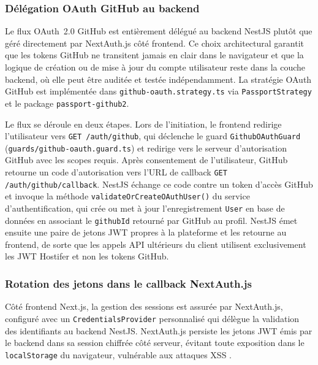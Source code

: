 \subsubsection*{Délégation OAuth GitHub au backend}

Le flux OAuth~2.0 GitHub est entièrement délégué au backend NestJS plutôt que géré directement par NextAuth.js côté frontend. Ce choix architectural garantit que les tokens GitHub ne transitent jamais en clair dans le navigateur et que la logique de création ou de mise à jour du compte utilisateur reste dans la couche backend, où elle peut être auditée et testée indépendamment. La stratégie OAuth GitHub est implémentée dans \texttt{github-oauth.strategy.ts} via \texttt{PassportStrategy} et le package \texttt{passport-github2}.

Le flux se déroule en deux étapes. Lors de l'initiation, le frontend redirige l'utilisateur vers \texttt{GET /auth/github}, qui déclenche le guard \texttt{GithubOAuthGuard} (\texttt{guards/github-oauth.guard.ts}) et redirige vers le serveur d'autorisation GitHub avec les scopes requis. Après consentement de l'utilisateur, GitHub retourne un code d'autorisation vers l'URL de callback \texttt{GET /auth/github/callback}. NestJS échange ce code contre un token d'accès GitHub et invoque la méthode \texttt{validateOrCreateOAuthUser()} du service d'authentification, qui crée ou met à jour l'enregistrement \texttt{User} en base de données en associant le \texttt{githubId} retourné par GitHub au profil. NestJS émet ensuite une paire de jetons JWT propres à la plateforme et les retourne au frontend, de sorte que les appels API ultérieurs du client utilisent exclusivement les JWT Hostifer et non les tokens GitHub.

\subsubsection*{Rotation des jetons dans le callback NextAuth.js}

Côté frontend Next.js, la gestion des sessions est assurée par NextAuth.js, configuré avec un \texttt{CredentialsProvider} personnalisé qui délègue la validation des identifiants au backend NestJS. NextAuth.js persiste les jetons JWT émis par le backend dans sa session chiffrée côté serveur, évitant toute exposition dans le \texttt{localStorage} du navigateur, vulnérable aux attaques XSS \cite{nextauth-refresh}.

